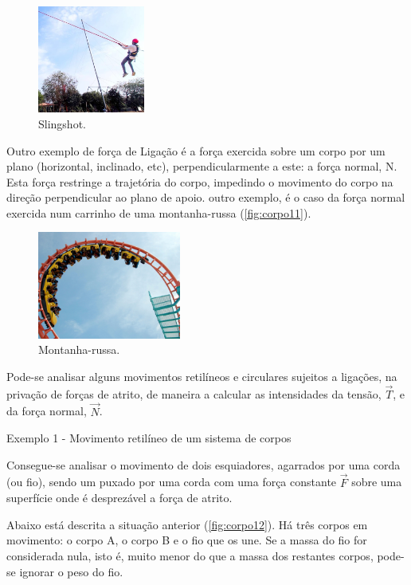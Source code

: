 \documentclass[a4paper,11pt,oneside]{report}
\begin{document}
\begin{figure}[H]
    \center
    \includegraphics[height=100pt]{figuras/hss.jpg}
    \caption{Slingshot.}
    \label{fig:corpo10}
\end{figure}

Outro exemplo de força de Ligação é a força exercida sobre um corpo por um plano 
(horizontal, inclinado, etc), perpendicularmente a este: a força normal, N. Esta 
força restringe a trajetória do corpo, impedindo o movimento do corpo na direção 
perpendicular ao plano de apoio. outro exemplo, é o caso da força normal exercida 
num carrinho de uma montanha-russa (\autoref{fig:corpo11}).

\begin{figure}[H]
    \center
    \includegraphics[height=100pt]{figuras/mr.jpg}
    \caption{Montanha-russa.}
    \label{fig:corpo11}
\end{figure}

Pode-se analisar alguns movimentos retilíneos e circulares sujeitos a ligações, 
na privação de forças de atrito, de maneira a calcular as intensidades da tensão, 
$\vec T$, e da força normal, $\vec N$.

\begin{center}
    Exemplo 1 - Movimento retilíneo de um sistema de corpos
\end{center}

Consegue-se analisar o movimento de dois esquiadores, agarrados por uma corda 
(ou fio), sendo um puxado por uma corda com uma força constante $\vec F$ sobre 
uma superfície onde é desprezável a força de atrito. 

Abaixo está descrita a situação anterior (\autoref{fig:corpo12}). Há três corpos em movimento: o corpo A, o 
corpo B e o fio que os une. Se a massa do fio for considerada nula, 
isto é, muito menor do que a massa dos restantes corpos, pode-se ignorar o peso do 
fio.
\end{document}
